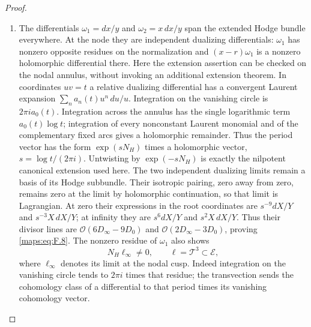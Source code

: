 \documentclass[11pt,a4paper]{article}
\theoremstyle{definition}
\begin{document}
\begin{proof}
\begin{enumerate}[label=\arabic*.]
\item The differentials $\omega_1=dx/y$ and $\omega_2=x\,dx/y$ span
the extended Hodge bundle everywhere.  At the node they are
independent dualizing differentials: $\omega_1$ has nonzero
opposite residues on the normalization and
$(x-r)\omega_1$ is a nonzero holomorphic differential there.
Here the extension assertion can be checked on the nodal
annulus, without invoking an additional extension theorem.
In coordinates $uv=t$ a relative dualizing differential has
a convergent Laurent expansion
$\sum_n a_n(t)u^n\,du/u$.  Integration on the vanishing circle
is $2\pi i a_0(t)$.  Integration across the annulus has the
single logarithmic term $a_0(t)\log t$; integration of every
nonconstant Laurent monomial and of the complementary fixed
arcs gives a holomorphic remainder.  Thus the period vector
has the form $\exp(sN_H)$ times a holomorphic vector,
$s=\log t/(2\pi i)$.  Untwisting by $\exp(-sN_H)$ is exactly
the nilpotent canonical extension used here.  The two independent
dualizing limits remain a basis of its Hodge subbundle.
Their isotropic pairing, zero away from zero, remains zero
at the limit by holomorphic continuation, so that limit is
Lagrangian.
At zero their expressions in the root coordinates are
$s^{-9}dX/Y$ and $s^{-3}X\,dX/Y$; at infinity they are
$s^6dX/Y$ and $s^2X\,dX/Y$.
Thus their divisor lines are
$\mathcal O(6D_\infty-9D_0)$ and
$\mathcal O(2D_\infty-3D_0)$, proving \eqref{maps:eq:F.8}.
The nonzero residue of $\omega_1$ also shows
\[
 N_H\ell_\infty\ne0,
 \qquad \ell=\mathcal T^3\subset\mathcal E,
 \tag{F.12}\label{maps:eq:F.12}
\]
where $\ell_\infty$ denotes its limit at the nodal cusp.
Indeed integration on the vanishing circle tends to
$2\pi i$ times that residue; the transvection sends the cohomology
class of a differential to that period times its vanishing
cohomology vector.

\end{enumerate}
\end{proof}
\end{document}
